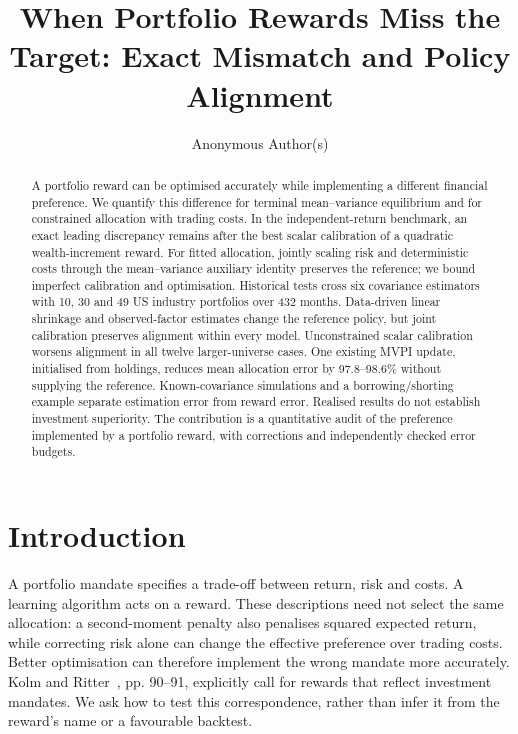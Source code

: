 \documentclass[sigconf,anonymous,review]{acmart}
\title{When Portfolio Rewards Miss the Target: Exact Mismatch and Policy Alignment}
\author{Anonymous Author(s)}
\begin{document}
\begin{abstract}
A portfolio reward can be optimised accurately while implementing a different financial preference. We quantify this difference for terminal mean--variance equilibrium and for constrained allocation with trading costs. In the independent-return benchmark, an exact leading discrepancy remains after the best scalar calibration of a quadratic wealth-increment reward. For fitted allocation, jointly scaling risk and deterministic costs through the mean--variance auxiliary identity preserves the reference; we bound imperfect calibration and optimisation. Historical tests cross six covariance estimators with 10, 30 and 49 US industry portfolios over 432 months. Data-driven linear shrinkage and observed-factor estimates change the reference policy, but joint calibration preserves alignment within every model. Unconstrained scalar calibration worsens alignment in all twelve larger-universe cases. One existing MVPI update, initialised from holdings, reduces mean allocation error by 97.8--98.6\% without supplying the reference. Known-covariance simulations and a borrowing/shorting example separate estimation error from reward error. Realised results do not establish investment superiority. The contribution is a quantitative audit of the preference implemented by a portfolio reward, with corrections and independently checked error budgets.
\end{abstract}
\maketitle

\section{Introduction}
A portfolio mandate specifies a trade-off between return, risk and costs. A learning algorithm acts on a reward. These descriptions need not select the same allocation: a second-moment penalty also penalises squared expected return, while correcting risk alone can change the effective preference over trading costs. Better optimisation can therefore implement the wrong mandate more accurately. Kolm and Ritter~\cite{kolm2025}, pp. 90--91, explicitly call for rewards that reflect investment mandates. We ask how to test this correspondence, rather than infer it from the reward's name or a favourable backtest.
\end{document}
